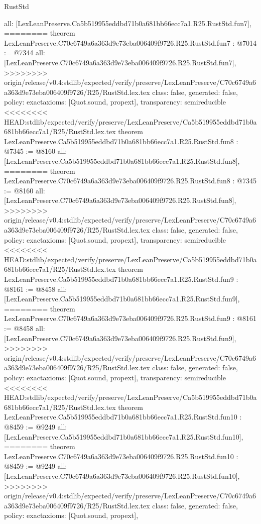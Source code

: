 \begin{lexlean}{RustStd}
\begin{coremodule}
{\begin{coremodule}
{{{{{{{{{{  all: [LexLeanPreserve.Ca5b519955eddbd71b0a681bb66ecc7a1.R25.RustStd.fun7],
========
theorem LexLeanPreserve.C70c6749a6a363d9e73eba006409f9726.R25.RustStd.fun7 : @7014 := @7344 {
  all: [LexLeanPreserve.C70c6749a6a363d9e73eba006409f9726.R25.RustStd.fun7],
>>>>>>>> origin/release/v0.4:stdlib/expected/verify/preserve/LexLeanPreserve/C70c6749a6a363d9e73eba006409f9726/R25/RustStd.lex.tex
  class: false,
  generated: false,
  policy: exact{axioms: [Quot.sound, propext]},
  transparency: semireducible
}
<<<<<<<< HEAD:stdlib/expected/verify/preserve/LexLeanPreserve/Ca5b519955eddbd71b0a681bb66ecc7a1/R25/RustStd.lex.tex
theorem LexLeanPreserve.Ca5b519955eddbd71b0a681bb66ecc7a1.R25.RustStd.fun8 : @7345 := @8160 {
  all: [LexLeanPreserve.Ca5b519955eddbd71b0a681bb66ecc7a1.R25.RustStd.fun8],
========
theorem LexLeanPreserve.C70c6749a6a363d9e73eba006409f9726.R25.RustStd.fun8 : @7345 := @8160 {
  all: [LexLeanPreserve.C70c6749a6a363d9e73eba006409f9726.R25.RustStd.fun8],
>>>>>>>> origin/release/v0.4:stdlib/expected/verify/preserve/LexLeanPreserve/C70c6749a6a363d9e73eba006409f9726/R25/RustStd.lex.tex
  class: false,
  generated: false,
  policy: exact{axioms: [Quot.sound, propext]},
  transparency: semireducible
}
<<<<<<<< HEAD:stdlib/expected/verify/preserve/LexLeanPreserve/Ca5b519955eddbd71b0a681bb66ecc7a1/R25/RustStd.lex.tex
theorem LexLeanPreserve.Ca5b519955eddbd71b0a681bb66ecc7a1.R25.RustStd.fun9 : @8161 := @8458 {
  all: [LexLeanPreserve.Ca5b519955eddbd71b0a681bb66ecc7a1.R25.RustStd.fun9],
========
theorem LexLeanPreserve.C70c6749a6a363d9e73eba006409f9726.R25.RustStd.fun9 : @8161 := @8458 {
  all: [LexLeanPreserve.C70c6749a6a363d9e73eba006409f9726.R25.RustStd.fun9],
>>>>>>>> origin/release/v0.4:stdlib/expected/verify/preserve/LexLeanPreserve/C70c6749a6a363d9e73eba006409f9726/R25/RustStd.lex.tex
  class: false,
  generated: false,
  policy: exact{axioms: [Quot.sound, propext]},
  transparency: semireducible
}
<<<<<<<< HEAD:stdlib/expected/verify/preserve/LexLeanPreserve/Ca5b519955eddbd71b0a681bb66ecc7a1/R25/RustStd.lex.tex
theorem LexLeanPreserve.Ca5b519955eddbd71b0a681bb66ecc7a1.R25.RustStd.fun10 : @8459 := @9249 {
  all: [LexLeanPreserve.Ca5b519955eddbd71b0a681bb66ecc7a1.R25.RustStd.fun10],
========
theorem LexLeanPreserve.C70c6749a6a363d9e73eba006409f9726.R25.RustStd.fun10 : @8459 := @9249 {
  all: [LexLeanPreserve.C70c6749a6a363d9e73eba006409f9726.R25.RustStd.fun10],
>>>>>>>> origin/release/v0.4:stdlib/expected/verify/preserve/LexLeanPreserve/C70c6749a6a363d9e73eba006409f9726/R25/RustStd.lex.tex
  class: false,
  generated: false,
  policy: exact{axioms: [Quot.sound, propext]},
}}}}}}}}}}}}}}
\end{coremodule}}
\end{coremodule}
\end{lexlean}
